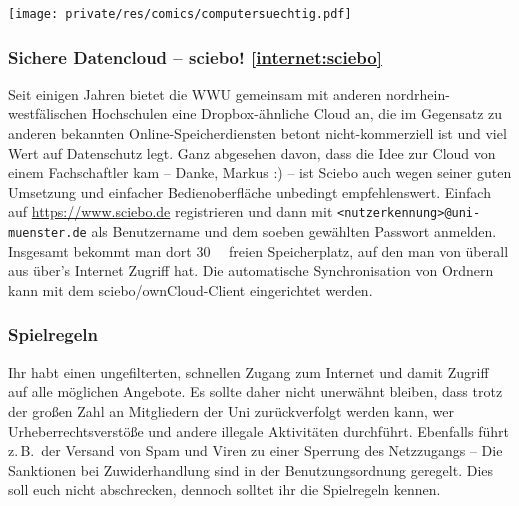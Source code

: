 \begin{multicols}{2}
\begin{center}
	\texttt{[image: private/res/comics/computersuechtig.pdf]}
\end{center}

\subsubsection[Sichere Datencloud -- sciebo!]{Sichere Datencloud -- sciebo! \cref{internet:sciebo}}
Seit einigen Jahren bietet die WWU gemeinsam mit anderen nordrhein-westfälischen Hochschulen eine Dropbox-ähnliche Cloud an, die im Gegensatz zu anderen bekannten Online-Speicherdiensten betont nicht-kommerziell ist und viel Wert auf Datenschutz legt.
Ganz abgesehen davon, dass die Idee zur Cloud von einem Fachschaftler kam -- Danke, Markus :) -- ist Sciebo auch wegen seiner guten Umsetzung und einfacher Bedienoberfläche unbedingt empfehlenswert.
Einfach auf \url{https://www.sciebo.de} registrieren und dann mit \texttt{<nutzerkennung>@uni-muenster.de} als Benutzername und dem soeben gewählten Passwort anmelden.
Insgesamt bekommt man dort \SI{30}{\giga\byte} freien Speicherplatz, auf den man von überall aus über's Internet Zugriff hat.
Die automatische Synchronisation von Ordnern kann mit dem sciebo/ownCloud-Client eingerichtet werden.

\subsubsection{Spielregeln}
Ihr habt einen ungefilterten, schnellen Zugang zum Internet und damit Zugriff auf alle möglichen Angebote.
Es sollte daher nicht unerwähnt bleiben, dass trotz der großen Zahl an Mitgliedern der Uni zurückverfolgt werden kann, wer Urheberrechtsverstöße und andere illegale Aktivitäten durchführt.
Ebenfalls führt z.\,B.\ der Versand von Spam und Viren zu einer Sperrung des Netzzugangs -- Die Sanktionen bei Zuwiderhandlung sind in der Benutzungsordnung geregelt.
Dies soll euch nicht abschrecken, dennoch solltet ihr die Spielregeln kennen.


\end{multicols}
